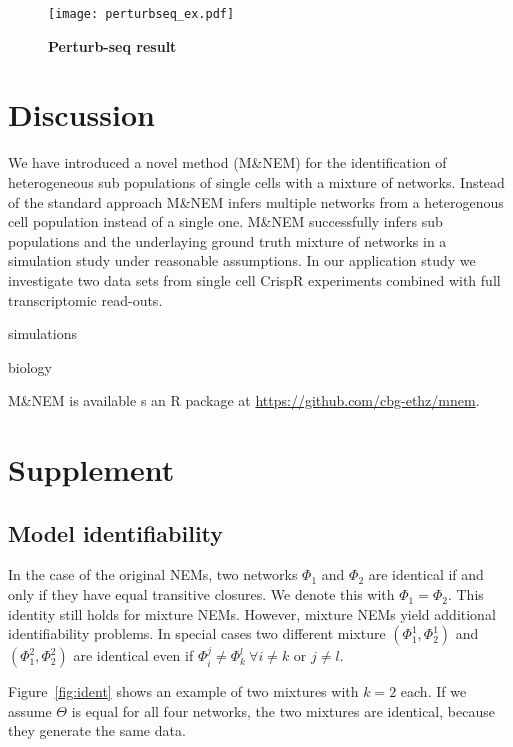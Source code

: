 \documentclass[12pt]{article}
\begin{document}
\begin{figure}
\texttt{[image: perturbseq\_ex.pdf]}
\caption{\textbf{Perturb-seq result}}\label{fig:cropseq}
\end{figure}

\section{Discussion}

We have introduced a novel method (M\&NEM) for the identification of heterogeneous sub populations of single cells with a mixture of networks. Instead of the standard approach M\&NEM infers multiple networks from a heterogenous cell population instead of a single one. M\&NEM successfully infers sub populations and the underlaying ground truth mixture of networks in a simulation study under reasonable assumptions. In our application study we investigate two data sets from single cell CrispR experiments combined with full transcriptomic read-outs.

simulations

biology

M\&NEM is available s an R package at \url{https://github.com/cbg-ethz/mnem}.

\section{Supplement}

\subsection{Model identifiability}

In the case of the original NEMs, two networks $\Phi_1$ and $\Phi_2$ are identical if and only if they have equal transitive closures. We denote this with $\Phi_1 = \Phi_2$. This identity still holds for mixture NEMs. However, mixture NEMs yield additional identifiability problems. In special cases two different mixture $(\Phi^1_1, \Phi_2^1)$ and $(\Phi_1^2, \Phi_2^2)$ are identical even if $\Phi_i^j \neq \Phi_k^l ~\forall i \neq k \text{ or } j \neq l$.

Figure~\ref{fig:ident} shows an example of two mixtures with $k=2$ each. If we assume $\Theta$ is equal for all four networks, the two mixtures are identical, because they generate the same data.
\end{document}
